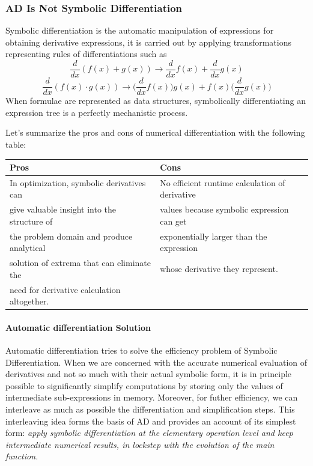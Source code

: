 \subsubsection{AD Is Not Symbolic Differentiation}
Symbolic differentiation is the automatic manipulation of expressions for obtaining derivative expressions, it is carried out by applying transformations representing rules of differentiations such as
$$ \frac{d}{dx}(f(x)+g(x)) \rightarrow \frac{d}{dx} f(x) + \frac{d}{dx} g(x) $$
$$ \frac{d}{dx}(f(x)\cdot g(x))\rightarrow \bigg( \frac{d}{dx} f(x) \bigg) g(x) + f(x) \bigg( \frac{d}{dx} g(x) \bigg) $$
\noindent When formulae are represented as data structures, symbolically differentiating an expression tree is a perfectly mechanistic process. 

Let's summarize the pros and cons of numerical differentiation with the following table:

\begin{center}
\begin{tabular}{ |l|l| } 
\hline
 Pros & Cons\\
\hline
In optimization, symbolic derivatives can & No efficient runtime calculation of derivative  \\
give valuable insight into the structure of & values because symbolic expression can get \\ 
the problem domain and produce analytical & exponentially larger than the expression   \\
 solution of extrema that can eliminate the & whose derivative they represent.\\ 
need for derivative calculation altogether.  & \\ \hline
\end{tabular}
\end{center}

\paragraph{Automatic differentiation Solution} Automatic differentiation tries to solve the efficiency problem of Symbolic Differentiation. When we are concerned with the accurate numerical evaluation of derivatives and not so much with their actual symbolic form, it is in principle possible to significantly simplify computations by storing only the values of intermediate sub-expressions in memory. Moreover, for futher efficiency, we can interleave as much as possible the differentiation and simplification steps. This interleaving idea forms the basis of AD and provides an account of its simplest form: \textit{apply symbolic differentiation at the elementary operation level and keep intermediate numerical results, in lockstep with the evolution of the main function.}

